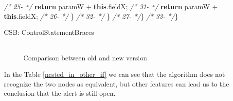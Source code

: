 \documentclass[
]{article}
\newenvironment{Shaded}{\begin{snugshade}}{\end{snugshade}}
\newcommand{\CommentTok}[1]{\textcolor[rgb]{0.56,0.35,0.01}{\textit{#1}}}
\newcommand{\FunctionTok}[1]{\textcolor[rgb]{0.00,0.00,0.00}{#1}}
\newcommand{\KeywordTok}[1]{\textcolor[rgb]{0.13,0.29,0.53}{\textbf{#1}}}
\newcommand{\NormalTok}[1]{#1}
\begin{document}
\begin{landscape}
\begin{Shaded}
\begin{Highlighting}[]
\CommentTok{/* 25-   */}        \KeywordTok{return}\NormalTok{ paramW + }\KeywordTok{this}\NormalTok{.}\FunctionTok{fieldX}\NormalTok{;                     }\CommentTok{/* 31-   */}        \KeywordTok{return}\NormalTok{ paramW + }\KeywordTok{this}\NormalTok{.}\FunctionTok{fieldX}\NormalTok{;                     }
\CommentTok{/* 26-   */}\NormalTok{     \}                                                   }\CommentTok{/* 32-   */}\NormalTok{     \}                                                   }
\CommentTok{/* 27-   */}\NormalTok{\}                                                        }\CommentTok{/* 33-   */}\NormalTok{\}                                                        }


\NormalTok{CSB: ControlStatementBraces}
\end{Highlighting}
\end{Shaded}

\normalsize

\begin{figure}
\centering
\includegraphics{figures/fake.png}
\caption{Comparison between old and new version
\label{comparison_nested_in_other_if}}
\end{figure}

\end{landscape}

\newpage

In the Table \ref{nested_in_other_if} we can see that the algorithm does
not recognize the two nodes as equivalent, but other features can lead
us to the conclusion that the alert is still open.

\small
\end{document}
